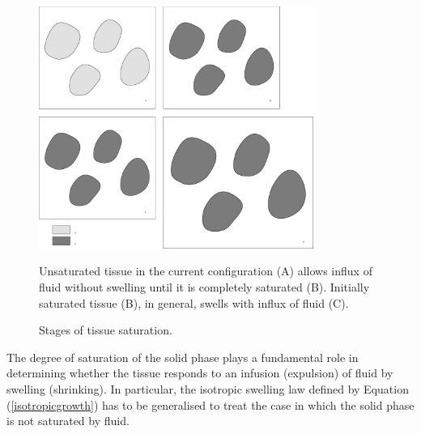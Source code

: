 \begin{figure}[ht]
  \begin{center}
    \includegraphics[width=0.8\textwidth]{images/elucidation/saturation-stages}
    \caption{Stages of tissue saturation.}
  \end{center}
      {Unsaturated tissue in the current configuration (A) allows influx
        of fluid without swelling until it is completely saturated
        (B). Initially saturated tissue (B), in general, swells with
        influx of fluid (C).}
      \label{saturation-and-swelling}
\end{figure}

\noindent The degree of saturation of the solid phase plays a
fundamental role in determining whether the tissue responds to an
infusion (expulsion) of fluid by swelling (shrinking). In 
particular, the isotropic swelling law defined by Equation
(\ref{isotropicgrowth}) has to be generalised to treat the case in
which the solid phase is not saturated by fluid.

